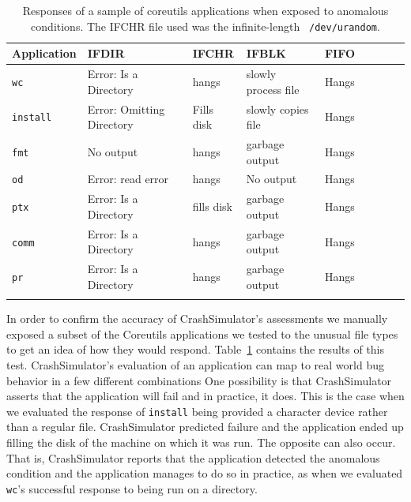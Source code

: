 \begin{table}[t]
    \scriptsize{}
    \begin{tabular}{l  l  l  l  l  l  l  l  l}
    \toprule{}
        Application         & IFDIR                     & IFCHR       & IFBLK                & FIFO \\
\hline
        {\tt wc}            & Error: Is a Directory     & hangs       & slowly process file  & Hangs\\
        {\tt install}       & Error: Omitting Directory & Fills disk  & slowly copies file   & Hangs\\
        {\tt fmt}           & No output                 & hangs       & garbage output       & Hangs\\
        {\tt od}            & Error: read error         & hangs       & No output            & Hangs\\
        {\tt ptx}           & Error: Is a Directory     & fills disk  & garbage output       & Hangs\\
        {\tt comm}          & Error: Is a Directory     & hangs       & garbage output       & Hangs\\
        {\tt pr}            & Error: Is a Directory     & hangs       & garbage output       & Hangs\\
\hline
    \bottomrule{}
    \end{tabular}
    \caption{Responses of a sample of coreutils applications when exposed to
      anomalous conditions.  The IFCHR file used was the infinite-length {\tt
        /dev/urandom}.}
    \label{table:applicationresponses}
\end{table}


In order to confirm the accuracy of CrashSimulator's assessments we manually
exposed a subset of the Coreutils applications we tested to the unusual file
types to get an idea of how they would respond.
Table~\ref{table:applicationresponses} contains the results of this test.
CrashSimulator's evaluation of an application can map to real world bug behavior
in a few different combinations
One
possibility is that CrashSimulator asserts that the application will fail
and in practice, it does.  This is the case when we evaluated
the response of  {\tt install} being provided a character device
rather than a regular file. CrashSimulator predicted failure and the
application ended up filling the disk of the machine on which it was run.  The
opposite can also occur.  That is, CrashSimulator reports that the
application detected the anomalous condition and the application manages to
do so in practice,  as when we evaluated {\tt wc}'s successful response to
being run on a directory.

